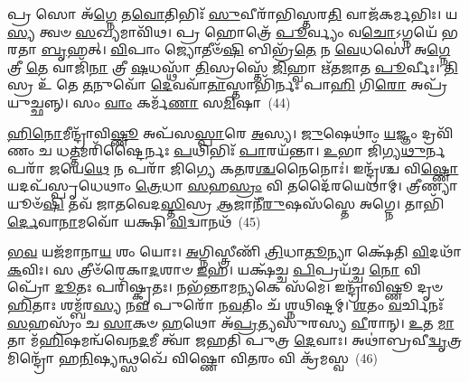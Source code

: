 {\anuvakamend[{\-\ul{𑌰}\-\-\ul{𑌕𑍍𑌷}\-\-\ul{𑌸𑍍𑌵} 𑌭𑍍𑌰𑌾𑌤𑍃᳴\-\ul{𑌵𑍍𑌯}\-𑌸𑍍𑌤𑍍𑌰𑌯𑍋᳴𑌦𑌶 𑌚}]}%

𑌪𑍍𑌰 𑌸𑍋 𑌅᳴\-\ul{𑌗𑍍𑌨𑍇} 𑌤\-\ul{𑌵𑍋}\-𑌤𑌿𑌭𑌿𑌃᳴ \ul{𑌸𑍁}\-𑌵𑍀𑌰𑌾᳴𑌭𑌿𑌸𑍍𑌤𑌰\-\ul{𑌤𑌿} 𑌵𑌾𑌜᳴𑌕𑌰𑍍𑌮𑌭𑌿𑌃। 𑌯\-\ul{𑌸𑍍𑌯} 𑌤𑍍𑌵𑍞 \ul{𑌸}\-𑌖𑍍𑌯𑌮𑌾𑌵𑌿᳴𑌥। 𑌪𑍍𑌰 𑌹𑍋𑌤𑍍𑌰𑍇᳴ \ul{𑌪𑍂}\-𑌰𑍍𑌵𑍍𑌯𑌂 𑌵\-\ul{𑌚𑍋}\-\-𑌽𑌗𑍍𑌨𑌯𑍇᳴ 𑌭𑌰𑌤𑌾 \ul{𑌬𑍃}\-𑌹𑌤𑍍। \ul{𑌵𑌿}\-𑌪𑌾𑌂 𑌜𑍍𑌯𑍋𑌤𑍀𑍞᳴\-\ul{𑌷𑌿} 𑌬𑌿𑌭𑍍𑌰᳴\-\ul{𑌤𑍇} 𑌨 \ul{𑌵𑍇}\-𑌧𑌸𑍇॑। 𑌅\-\ul{𑌗𑍍𑌨𑍇} 𑌤𑍍𑌰𑍀 \ul{𑌤𑍇} 𑌵𑌾𑌜𑌿᳴\-\ul{𑌨𑌾} 𑌤𑍍𑌰𑍀 \ul{𑌷}\-𑌧𑌸𑍍𑌥𑌾᳴ \ul{𑌤𑌿}\-𑌸𑍍𑌰𑌸𑍍𑌤𑍇᳴ \ul{𑌜𑌿}\-𑌹𑍍𑌵𑌾 𑌋᳴𑌤𑌜𑌾𑌤 \ul{𑌪𑍂}\-𑌰𑍍𑌵𑍀𑌃। \ul{𑌤𑌿}\-𑌸𑍍𑌰 𑌉᳴ 𑌤𑍇 \ul{𑌤}\-𑌨𑍁𑌵𑍋᳴ \ul{𑌦𑍇}\-𑌵𑌵𑌾᳴\-\ul{𑌤𑌾}\-𑌸𑍍𑌤𑌾𑌭𑌿᳴𑌰𑍍𑌨𑌃 𑌪𑌾\-\ul{𑌹𑌿} 𑌗𑌿\-\ul{𑌰𑍋} 𑌅𑌪𑍍𑌰᳴𑌯𑍁𑌚𑍍𑌛𑌨𑍍𑌨𑍍। 𑌸𑌂 \ul{𑌵𑌾𑌂} 𑌕𑌰𑍍𑌮᳴\-\ul{𑌣𑌾} 𑌸\-\ul{𑌮𑌿}\-𑌷𑌾~(44)

\-\ul{𑌹𑌿}\-\-\ul{𑌨𑍋}\-𑌮𑍀𑌨𑍍𑌦𑍍𑌰𑌾᳴𑌵𑌿\-\ul{𑌷𑍍𑌣𑍂} 𑌅𑌪᳴𑌸\-\ul{𑌸𑍍𑌪𑌾}\-𑌰𑍇 \ul{𑌅}\-𑌸𑍍𑌯। \ul{𑌜𑍁}\-𑌷𑍇𑌥𑌾𑌂॑ \ul{𑌯}\-𑌜𑍍𑌞𑌂 𑌦𑍍𑌰𑌵𑌿᳴𑌣𑌂 𑌚 𑌧\-\ul{𑌤𑍍𑌤}\-𑌮𑌰𑌿᳴𑌷𑍍𑌟𑍈𑌰𑍍𑌨𑌃 \ul{𑌪}\-𑌥𑌿𑌭𑌿𑌃᳴ \ul{𑌪𑌾}\-𑌰𑌯᳴𑌨𑍍𑌤𑌾। \ul{𑌉}\-𑌭𑌾 𑌜𑌿᳴𑌗𑍍𑌯\-\ul{𑌥𑍁}\-𑌰𑍍𑌨 𑌪𑌰𑌾᳴ 𑌜𑌯𑍇\-\ul{𑌥𑍇} 𑌨 𑌪𑌰𑌾᳴ 𑌜𑌿𑌗𑍍𑌯𑍇 𑌕\-\ul{𑌤}\-𑌰\-\ul{𑌶𑍍𑌚}\-𑌨𑍈𑌨𑍋𑌃॑। 𑌇𑌨𑍍𑌦𑍍𑌰᳴𑌶𑍍𑌚 𑌵𑌿\-\ul{𑌷𑍍𑌣𑍋} 𑌯𑌦𑌪᳴𑌸𑍍𑌪𑍃𑌧𑍇𑌥𑌾𑌂 \ul{𑌤𑍍𑌰𑍇}\-𑌧𑌾 \ul{𑌸}\-𑌹\-\ul{𑌸𑍍𑌰𑌂} 𑌵𑌿 𑌤𑌦𑍈᳴𑌰𑌯𑍇𑌥𑌾𑌮𑍍। 𑌤𑍍𑌰𑍀𑌣𑍍𑌯𑌾𑌯𑍂𑍞᳴\-\ul{𑌷𑌿} 𑌤𑌵᳴ 𑌜𑌾𑌤𑌵𑍇𑌦\-\ul{𑌸𑍍𑌤𑌿}\-𑌸𑍍𑌰 \ul{𑌆}\-𑌜𑌾𑌨𑍀᳴\-\ul{𑌰𑍁}\-𑌷𑌸᳴𑌸𑍍𑌤𑍇 𑌅𑌗𑍍𑌨𑍇। 𑌤𑌾𑌭𑌿᳴\-\ul{𑌰𑍍𑌦𑍇}\-𑌵𑌾\-\ul{𑌨𑌾}\-𑌮𑌵𑍋᳴ 𑌯𑌕𑍍𑌷𑌿 \ul{𑌵𑌿}\-𑌦𑍍𑌵𑌾𑌨𑌥᳴~(45)

\-\ul{𑌭}\-\-\ul{𑌵} 𑌯𑌜᳴𑌮𑌾𑌨𑌾\-\ul{𑌯} 𑌶𑌂 𑌯𑍋𑌃। \ul{𑌅}\-𑌗𑍍𑌨𑌿𑌸𑍍𑌤𑍍𑌰𑍀𑌣𑌿᳴ \ul{𑌤𑍍𑌰𑌿}\-𑌧𑌾\-\ul{𑌤𑍂}\-𑌨𑍍𑌯𑌾 𑌕𑍍𑌷𑍇᳴𑌤𑌿 \ul{𑌵𑌿}\-𑌦𑌥𑌾᳴ \ul{𑌕}\-𑌵𑌿𑌃। 𑌸 𑌤𑍍𑌰𑍀𑍞᳴𑌰𑍇𑌕𑌾\-\ul{𑌦}\-𑌶𑌾𑍞 \ul{𑌇}\-𑌹। 𑌯𑌕𑍍𑌷᳴𑌚𑍍𑌚 \ul{𑌪𑌿}\-𑌪𑍍𑌰𑌯᳴𑌚𑍍𑌚 \ul{𑌨𑍋} 𑌵𑌿𑌪𑍍𑌰𑍋᳴ \ul{𑌦𑍂}\-𑌤𑌃 𑌪𑌰𑌿᳴𑌷𑍍𑌕𑍃𑌤𑌃। 𑌨𑌭᳴𑌨𑍍𑌤𑌾𑌮\-\ul{𑌨𑍍𑌯}\-𑌕𑍇 𑌸᳴𑌮𑍇। 𑌇𑌨𑍍𑌦𑍍𑌰𑌾᳴𑌵𑌿𑌷𑍍𑌣𑍂 𑌦𑍃𑍞\-\ul{𑌹𑌿}\-𑌤𑌾𑌃 𑌶𑌮𑍍𑌬᳴𑌰\-\ul{𑌸𑍍𑌯} 𑌨\-\ul{𑌵} 𑌪𑍁𑌰𑍋᳴ 𑌨\-\ul{𑌵}\-𑌤𑌿𑌂 𑌚᳴ 𑌶𑍍𑌨𑌥𑌿𑌷𑍍𑌟𑌮𑍍। \ul{𑌶}\-𑌤𑌂 \ul{𑌵}\-𑌰𑍍𑌚𑌿𑌨𑌃᳴ \ul{𑌸}\-𑌹𑌸𑍍𑌰𑌂᳴ 𑌚 \ul{𑌸𑌾}\-𑌕𑍞 \ul{𑌹}\-𑌥𑍋 𑌅᳴\-\ul{𑌪𑍍𑌰}\-𑌤𑍍𑌯𑌸𑍁᳴𑌰𑌸𑍍𑌯 \ul{𑌵𑍀}\-𑌰𑌾𑌨𑍍। \ul{𑌉}\-𑌤 \ul{𑌮𑌾}\-𑌤𑌾 𑌮᳴\-\ul{𑌹𑌿}\-𑌷𑌮𑌨𑍍𑌵᳴𑌵𑍇𑌨\-\ul{𑌦}\-𑌮𑍀 𑌤𑍍𑌵𑌾᳴ 𑌜𑌹𑌤𑌿 𑌪𑍁𑌤𑍍𑌰 \ul{𑌦𑍇}\-𑌵𑌾𑌃। 𑌅𑌥𑌾॑𑌬𑍍𑌰𑌵𑍀\-\ul{𑌦𑍍𑌵𑍃}\-𑌤𑍍𑌰𑌮𑌿𑌨𑍍𑌦𑍍𑌰𑍋᳴ 𑌹\-\ul{𑌨𑌿}\-𑌷𑍍𑌯𑌨𑍍𑌥𑍍𑌸𑌖𑍇᳴ 𑌵𑌿𑌷𑍍𑌣𑍋 𑌵𑌿\-\ul{𑌤}\-𑌰𑌂 𑌵𑌿 𑌕𑍍𑌰᳴𑌮𑌸𑍍𑌵~(46)


{\anuvakamend[{\-\ul{𑌇}\-𑌷𑌾\-𑌽𑌥᳴ \ul{𑌤𑍍𑌵𑌾} 𑌤𑍍𑌰𑌯𑍋᳴𑌦𑌶 𑌚}]}%

\prashnaend[{𑌯𑍋 𑌵𑍈 𑌸𑍍𑌫𑍍𑌯𑌃 \ul{𑌸𑍍𑌵}\-𑌸𑍍𑌤𑌿𑌃 \ul{𑌸𑍍𑌵}\-𑌧𑌾\-\ul{𑌯𑍈} 𑌨\-\ul{𑌮𑌃} 𑌪𑍍𑌰 𑌮𑍁़᳴\-\ul{𑌞𑍍𑌚} 𑌤𑌿𑌷𑍍𑌠᳴𑌤𑍀\-\ul{𑌵} 𑌷𑌟𑍍𑌚᳴𑌤𑍍𑌵𑌾𑌰𑌿𑍞𑌶𑌤𑍍॥46॥ 𑌯𑍋 𑌵𑍈 𑌪𑌵᳴𑌮𑌾𑌨𑌾\-\ul{𑌨𑌾𑌂} 𑌵𑌿 𑌕𑍍𑌰᳴𑌮𑌸𑍍𑌵॥}]

